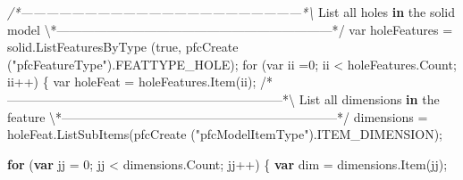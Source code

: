 \documentclass[]{article}
\newenvironment{Shaded}{}{}
\newcommand{\KeywordTok}[1]{\textcolor[rgb]{0.00,0.44,0.13}{\textbf{{#1}}}}
\newcommand{\DecValTok}[1]{\textcolor[rgb]{0.25,0.63,0.44}{{#1}}}
\newcommand{\FloatTok}[1]{\textcolor[rgb]{0.25,0.63,0.44}{{#1}}}
\newcommand{\StringTok}[1]{\textcolor[rgb]{0.25,0.44,0.63}{{#1}}}
\newcommand{\CommentTok}[1]{\textcolor[rgb]{0.38,0.63,0.69}{\textit{{#1}}}}
\newcommand{\OtherTok}[1]{\textcolor[rgb]{0.00,0.44,0.13}{{#1}}}
\newcommand{\FunctionTok}[1]{\textcolor[rgb]{0.02,0.16,0.49}{{#1}}}
\newcommand{\NormalTok}[1]{{#1}}
\begin{document}
\begin{Shaded}
\begin{Highlighting}[]
\CommentTok{/*------------------------------------------------------------------*\textbackslash{}}
  \NormalTok{List all holes }\KeywordTok{in} \NormalTok{the solid model}
\NormalTok{\textbackslash{}*------------------------------------------------------------------*}\OtherTok{/ }
\OtherTok{  var holeFeatures = solid.ListFeaturesByType }\FloatTok{(}\OtherTok{true, }
\OtherTok{         pfcCreate }\FloatTok{(}\OtherTok{"pfcFeatureType"}\FloatTok{)}\OtherTok{.FEATTYPE_HOLE}\FloatTok{)}\OtherTok{;}
\OtherTok{  for }\FloatTok{(}\OtherTok{var ii =0; ii < holeFeatures.Count; ii}\FloatTok{++)}
\OtherTok{    \{}
\OtherTok{      var holeFeat = holeFeatures.Item}\FloatTok{(}\OtherTok{ii}\FloatTok{)}\OtherTok{;}
\OtherTok{      }
\OtherTok{/}\NormalTok{*------------------------------------------------------------------*\textbackslash{}}
  \NormalTok{List all dimensions }\KeywordTok{in} \NormalTok{the feature }
\NormalTok{\textbackslash{}*------------------------------------------------------------------*}\OtherTok{/}
      \NormalTok{dimensions = }
    \OtherTok{holeFeat}\NormalTok{.}\FunctionTok{ListSubItems}\NormalTok{(}\FunctionTok{pfcCreate} \NormalTok{(}\StringTok{"pfcModelItemType"}\NormalTok{).}\FunctionTok{ITEM_DIMENSION}\NormalTok{);}
      
      \KeywordTok{for} \NormalTok{(}\KeywordTok{var} \NormalTok{jj = }\DecValTok{0}\NormalTok{; jj < }\OtherTok{dimensions}\NormalTok{.}\FunctionTok{Count}\NormalTok{; jj++)}
    \NormalTok{\{}
      \KeywordTok{var} \NormalTok{dim = }\OtherTok{dimensions}\NormalTok{.}\FunctionTok{Item}\NormalTok{(jj);}
      

\end{Highlighting}
\end{Shaded}
\end{document}
